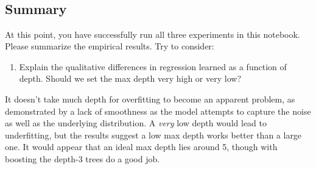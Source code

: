 \documentclass[11pt]{article}
\providecommand{\tightlist}{%
      \setlength{\itemsep}{0pt}\setlength{\parskip}{0pt}}
\begin{document}
    \begin{center}
    \end{center}
    { \hspace*{\fill} \\}
    
    \begin{center}
    \end{center}
    { \hspace*{\fill} \\}
    
    \begin{center}
    \end{center}
    { \hspace*{\fill} \\}
    
    \begin{center}
    \end{center}
    { \hspace*{\fill} \\}
    
    \subsection{Summary}\label{summary}

At this point, you have successfully run all three experiments in this
notebook. Please summarize the empirical results. Try to consider:

    \begin{enumerate}
\def\labelenumi{\arabic{enumi}.}
\tightlist
\item
  Explain the qualitative differences in regression learned as a
  function of depth. Should we set the max depth very high or very low?
\end{enumerate}

    It doesn't take much depth for overfitting to become an apparent
problem, as demonstrated by a lack of smoothness as the model attempts
to capture the noise as well as the underlying distribution. A
\emph{very} low depth would lead to underfitting, but the results
suggest a low max depth works better than a large one. It would appear
that an ideal max depth lies around 5, though with boosting the depth-3
trees do a good job.
\end{document}
